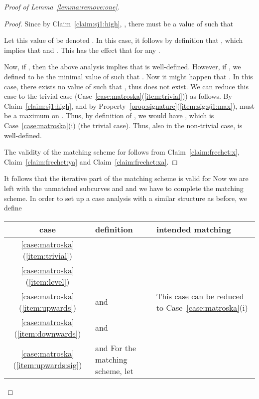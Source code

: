 \documentclass[11pt, letter]{article}
\newcommand{\lemref}[1]{Lemma~\ref{lemma:#1}}
\newcommand{\caseref}[1]{Case~\ref{case:#1}}
\newcommand{\claimref}[1]{Claim~\ref{claim:#1}}
\newcommand{\propref}[1]{Property~\ref{prop:#1}}
\begin{document}
\begin{proof}[Proof of \lemref{remove:one}]
\begin{proof}
Since by \claimref{sj1:high}, ,
there must be a value of  such that 

Let this value of  be denoted .
In this case, it follows by definition that , 
which implies that  and .
This has the effect that  for any .

Now, if , then the above analysis implies that  is well-defined.
However, if , we defined  to be the minimal value of 
such that . Now it might happen that .
In this case, there exists no value of  such that , thus  does not exist.
We can reduce this case to the trivial case (\caseref{matroska}(\ref{item:trivial})) as follows. 
By \claimref{sj1:high},  and by
\propref{signature}(\ref{item:sig:sj1:max}),  must be a maximum on . Thus, by definition of , we would have 
, which is
\caseref{matroska}(i) (the trivial case).
Thus, also in the non-trivial case,  is well-defined.

The validity of the matching scheme  for  follows from \claimref{frechet:x}, \claimref{frechet:ya} and \claimref{frechet:xa}.
\end{proof}

It follows that the iterative part of the matching scheme is valid for  
Now we are left with the unmatched subcurves  and
 and we have to complete the matching scheme.
In order to set up a case analysis with a similar structure as before, we define 


\begin{table}[h]
\center
\begin{tabular}{|c|m{7.5cm}|m{5cm}|}
\hline
case & definition & intended matching\\
\hline
\ref{case:matroska}(\ref{item:trivial}) & 

&
\newline
\\
\hline
\ref{case:matroska}(\ref{item:level}) & 

&
\newline
 \\
\hline
\ref{case:matroska}(\ref{item:upwards}) & 
 and \newline
 
&
This case can be reduced\newline
to \caseref{matroska}(i) 
\\
\hline
\ref{case:matroska}(\ref{item:downwards}) & 
 and\newline
 
&
\newline
\newline

\\
\hline
\ref{case:matroska}(\ref{item:upwards:sig}) &
 and \newline
\newline
For the matching scheme, let\newline 
 \newline
 \newline
 

\end{tabular}
\end{table}
\end{proof}
\end{document}
